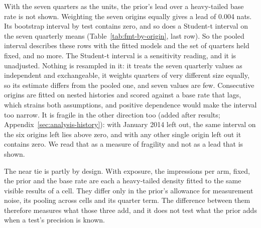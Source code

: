 With the seven quarters as the units, the prior's lead over a heavy-tailed base rate is not shown. Weighting the seven origins equally gives a lead of 0.004 nats. Its bootstrap interval by test contains zero, and so does a Student-t interval on the seven quarterly means (Table~\ref{tab:fmt-by-origin}, last row). So the pooled interval describes these rows with the fitted models and the set of quarters held fixed, and no more. The Student-t interval is a sensitivity reading, and it is unadjusted. Nothing is resampled in it: it treats the seven quarterly values as independent and exchangeable, it weights quarters of very different size equally, so its estimate differs from the pooled one, and seven values are few. Consecutive origins are fitted on nested histories and scored against a base rate that lags, which strains both assumptions, and positive dependence would make the interval too narrow. It is fragile in the other direction too (added after results; Appendix~\ref{sec:analysis-history}): with January 2014 left out, the same interval on the six origins left lies above zero, and with any other single origin left out it contains zero. We read that as a measure of fragility and not as a lead that is shown.

The near tie is partly by design. With exposure, the impressions per arm, fixed, the prior and the base rate are each a heavy-tailed density fitted to the same visible results of a cell. They differ only in the prior's allowance for measurement noise, its pooling across cells and its quarter term. The difference between them therefore measures what those three add, and it does not test what the prior adds when a test's precision is known.

